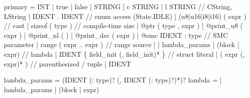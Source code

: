 \documentclass[
  11pt,
]{article}
\newenvironment{Shaded}{\begin{snugshade}}{\end{snugshade}}
\newcommand{\NormalTok}[1]{#1}
\begin{document}
\begin{Shaded}
\begin{Highlighting}[]
\NormalTok{primary        = INT | \textquotesingle{}true\textquotesingle{} | \textquotesingle{}false\textquotesingle{}}
\NormalTok{               | STRING | \textquotesingle{}c\textquotesingle{} STRING | \textquotesingle{}l\textquotesingle{} STRING    // CString, LString}
\NormalTok{               | IDENT \textquotesingle{}.\textquotesingle{} IDENT                       // enum access (State.IDLE)}
\NormalTok{               | (\textquotesingle{}u8\textquotesingle{}|\textquotesingle{}u16\textquotesingle{}|\textquotesingle{}i8\textquotesingle{}|\textquotesingle{}i16\textquotesingle{}) \textquotesingle{}(\textquotesingle{} expr \textquotesingle{})\textquotesingle{}   // cast}
\NormalTok{               | \textquotesingle{}sizeof\textquotesingle{} \textquotesingle{}(\textquotesingle{} type \textquotesingle{})\textquotesingle{}                    // compile{-}time size}
\NormalTok{               | \textquotesingle{}@ptr\textquotesingle{} \textquotesingle{}(\textquotesingle{} type \textquotesingle{},\textquotesingle{} expr \textquotesingle{})\textquotesingle{}}
\NormalTok{               | \textquotesingle{}@print\_u8\textquotesingle{} \textquotesingle{}(\textquotesingle{} expr \textquotesingle{})\textquotesingle{} | \textquotesingle{}@print\_nl\textquotesingle{} \textquotesingle{}(\textquotesingle{} \textquotesingle{})\textquotesingle{} | \textquotesingle{}@print\_dec\textquotesingle{} \textquotesingle{}(\textquotesingle{} expr \textquotesingle{})\textquotesingle{}}
\NormalTok{               | \textquotesingle{}@smc\textquotesingle{} IDENT \textquotesingle{}:\textquotesingle{} type              // SMC parameter}
\NormalTok{               | \textquotesingle{}range\textquotesingle{} \textquotesingle{}(\textquotesingle{} expr \textquotesingle{}..\textquotesingle{} expr \textquotesingle{})\textquotesingle{}     // range source}
\NormalTok{               | \textquotesingle{}|\textquotesingle{} lambda\_params \textquotesingle{}|\textquotesingle{} (block | expr)    // lambda}
\NormalTok{               | IDENT \textquotesingle{}\{\textquotesingle{} field\_init (\textquotesingle{},\textquotesingle{} field\_init)* \textquotesingle{}\}\textquotesingle{}  // struct literal}
\NormalTok{               | \textquotesingle{}(\textquotesingle{} expr (\textquotesingle{},\textquotesingle{} expr)* \textquotesingle{})\textquotesingle{}           // parenthesized / tuple}
\NormalTok{               | IDENT}

\NormalTok{lambda\_params  = (IDENT (\textquotesingle{}:\textquotesingle{} type)? (\textquotesingle{},\textquotesingle{} IDENT (\textquotesingle{}:\textquotesingle{} type)?)*)?}
\NormalTok{lambda         = \textquotesingle{}|\textquotesingle{} lambda\_params \textquotesingle{}|\textquotesingle{} (block | expr)}


\end{Highlighting}
\end{Shaded}
\end{document}
